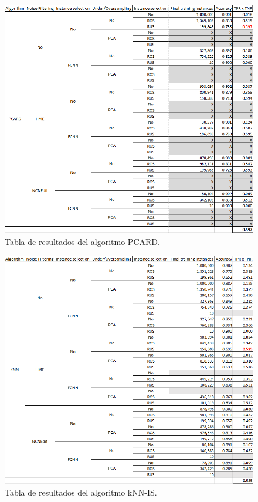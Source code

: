\begin{figure}[ht]
    \centerfloat
    \includegraphics[width=1.2\textwidth]{img/pcard.png}
    \caption{Tabla de resultados del algoritmo PCARD.}
\end{figure}

\begin{figure}[ht]
    \centerfloat
    \includegraphics[width=1.2\textwidth]{img/knn.png}
    \caption{Tabla de resultados del algoritmo kNN-IS.}
\end{figure}